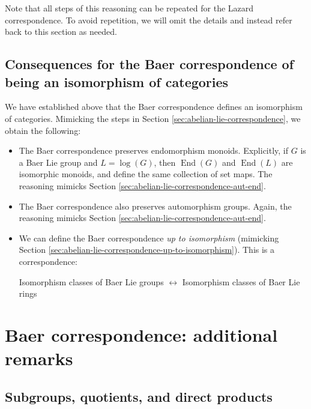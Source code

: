 Note that all steps of this reasoning can be repeated for the Lazard
correspondence. To avoid repetition, we will omit the details and
instead refer back to this section as needed.

\subsection{Consequences for the Baer correspondence of being an isomorphism of categories}\label{sec:baer-correspondence-isocat-consequences}

We have established above that the Baer correspondence defines an
isomorphism of categories. Mimicking the steps in Section
\ref{sec:abelian-lie-correspondence}, we obtain the following:

\begin{itemize}
\item The Baer correspondence preserves endomorphism
  monoids. Explicitly, if $G$ is a Baer Lie group and $L = \log(G)$,
  then $\operatorname{End}(G)$ and $\operatorname{End}(L)$ are
  isomorphic monoids, and define the same collection of set maps. The
  reasoning mimicks Section
  \ref{sec:abelian-lie-correspondence-aut-end}.
\item The Baer correspondence also preserves automorphism
  groups. Again, the reasoning mimicks Section
  \ref{sec:abelian-lie-correspondence-aut-end}.
\item We can define the Baer correspondence {\em up to isomorphism}
  (mimicking Section
  \ref{sec:abelian-lie-correspondence-up-to-isomorphism}). This is a
  correspondence:

  \begin{center}
    Isomorphism classes of Baer Lie groups $\leftrightarrow$
    Isomorphism classes of Baer Lie rings
  \end{center}
\end{itemize}


\section{Baer correspondence: additional remarks}\label{sec:baer-correspondence-more}

\subsection{Subgroups, quotients, and direct products}\label{sec:baer-correspondence-sub-quot-dp}


